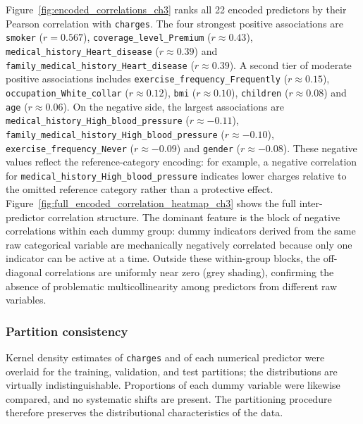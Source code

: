 \noindent
Figure~\ref{fig:encoded_correlations_ch3} ranks all 22 encoded predictors
by their Pearson correlation with \texttt{charges}. The four strongest
positive associations are \texttt{smoker} ($r = 0.567$),\allowbreak{}
\texttt{coverage\_level\_\allowbreak{}Premium} ($r \approx 0.43$),\allowbreak{}
\texttt{medical\_history\_\allowbreak{}Heart\_disease} ($r \approx 0.39$) and
\texttt{family\_medical\_\allowbreak{}history\_\allowbreak{}Heart\_disease} ($r \approx 0.39$).
A second tier of moderate positive associations includes
\texttt{exercise\_frequency\_\allowbreak{}Frequently} ($r \approx 0.15$),\allowbreak{}
\texttt{occupation\_\allowbreak{}White\_collar} ($r \approx 0.12$),\allowbreak{}
\texttt{bmi}
($r \approx 0.10$), \texttt{children} ($r \approx 0.08$) and \texttt{age}
($r \approx 0.06$). On the negative side, the largest associations are
\texttt{medical\_history\_\allowbreak{}High\_blood\_\allowbreak{}pressure} ($r \approx -0.11$),\allowbreak{}
\texttt{family\_medical\_\allowbreak{}history\_\allowbreak{}High\_blood\_\allowbreak{}pressure}
($r \approx -0.10$),\allowbreak{}
\texttt{exercise\_frequency\_\allowbreak{}Never}
($r \approx -0.09$) and \texttt{gender} ($r \approx -0.08$). These
negative values reflect the reference-category encoding: for example,
a negative correlation for
\texttt{medical\_history\_\allowbreak{}High\_blood\_\allowbreak{}pressure} indicates lower charges
relative to the omitted reference category rather than a protective effect.
Figure~\ref{fig:full_encoded_correlation_heatmap_ch3} shows the full
inter-predictor correlation structure. The dominant feature is the block
of negative correlations within each dummy group: dummy indicators derived
from the same raw categorical variable are mechanically negatively
correlated because only one indicator can be active at a time. Outside
these within-group blocks, the off-diagonal correlations are uniformly
near zero (grey shading), confirming the absence of problematic
multicollinearity among predictors from different raw variables.


\subsubsection{Partition consistency}
Kernel density estimates of \texttt{charges} and of each numerical
predictor were overlaid for the training, validation, and test partitions;
the distributions are virtually indistinguishable.  Proportions of each
dummy variable were likewise compared, and no systematic shifts are
present.  The partitioning procedure therefore preserves the
distributional characteristics of the data.

